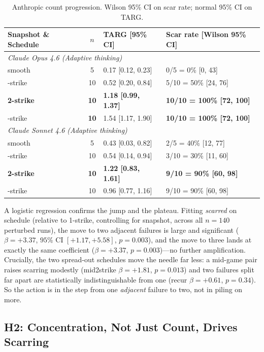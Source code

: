 \documentclass{article}
\begin{document}
\begin{table}[h]
\centering
\caption{Anthropic count progression. Wilson 95\% CI on scar rate; normal 95\% CI on TARG.}
\label{tab:threshold}
\small
\begin{tabular}{lcll}
\toprule
Snapshot \& Schedule & $n$ & TARG [95\% CI] & Scar rate [Wilson 95\% CI] \\
\midrule
\multicolumn{4}{l}{\emph{Claude Opus 4.6 (Adaptive thinking)}}\\
\quad smooth   & 5  & 0.17 [0.12, 0.23] & 0/5 = 0\% [0, 43] \\
\quad 1-strike & 10 & 0.52 [0.20, 0.84] & 5/10 = 50\% [24, 76] \\
\quad \textbf{2-strike} & \textbf{10}  & \textbf{1.18 [0.99, 1.37]} & \textbf{10/10 = 100\% [72, 100]} \\
\quad 3-strike & \textbf{10}  & 1.54 [1.17, 1.90] & \textbf{10/10 = 100\% [72, 100]} \\
\midrule
\multicolumn{4}{l}{\emph{Claude Sonnet 4.6 (Adaptive thinking)}}\\
\quad smooth   & 5  & 0.43 [0.03, 0.82] & 2/5 = 40\% [12, 77] \\
\quad 1-strike & 10 & 0.54 [0.14, 0.94] & 3/10 = 30\% [11, 60] \\
\quad \textbf{2-strike} & \textbf{10}  & \textbf{1.22 [0.83, 1.61]} & \textbf{9/10 = 90\% [60, 98]} \\
\quad 3-strike & 10  & 0.96 [0.77, 1.16] & 9/10 = 90\% [60, 98] \\
\bottomrule
\end{tabular}
\end{table}

A logistic regression confirms the jump and the plateau. Fitting \emph{scarred} on schedule (relative to 1-strike, controlling for snapshot, across all $n=140$ perturbed runs), the move to two adjacent failures is large and significant ($\beta = +3.37$, $95\%$ CI $[+1.17, +5.58]$, $p=0.003$), and the move to three lands at exactly the same coefficient ($\beta = +3.37$, $p=0.003$)---no further amplification. Crucially, the two spread-out schedules move the needle far less: a mid-game pair raises scarring modestly (mid2strike $\beta = +1.81$, $p=0.013$) and two failures split far apart are statistically indistinguishable from one (recur $\beta = +0.61$, $p=0.34$). So the action is in the step from one \emph{adjacent} failure to two, not in piling on more.

\subsection{H2: Concentration, Not Just Count, Drives Scarring}
\label{sec:h2}
\end{document}
